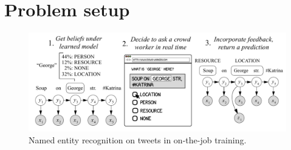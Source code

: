 \section{Problem setup}
\label{sec:model}

\begin{figure}[t]
  \begin{centering}
  \includegraphics[width=1.0\textwidth]{figures/intro-banner.pdf}
  \end{centering}
  \caption{
    Named entity recognition on tweets in on-the-job training.
}
\label{fig:crf}
\end{figure}

